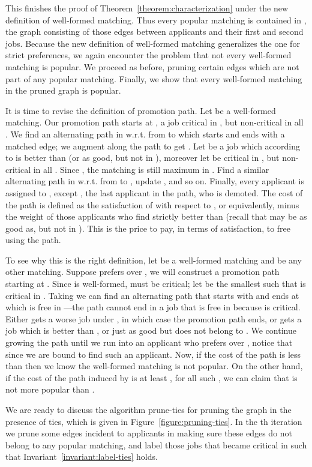 \documentclass[11pt]{article}
\newcommand{\wrt}{{w.r.t.}\xspace}
\begin{document}
{This finishes the proof of Theorem~\ref{theorem:characterization} under the new definition of well-formed matching. Thus every popular matching is contained in , the graph consisting of those edges between applicants and their first and second jobs. Because the new definition of well-formed matching generalizes the one for strict preferences, we again encounter the problem that not every well-formed matching is popular. We proceed as before, pruning certain edges which are not part of any popular matching. Finally, we show that every well-formed matching in the pruned graph is popular.

It is time to revise the definition of promotion path. Let  be a well-formed matching. Our promotion path starts at , a job critical in , but non-critical in all . We find an alternating path in  \wrt  from  to  which starts and ends with a matched edge; we augment along the path to get . Let  be a job which according to  is better than  (or as good, but not in ), moreover let  be critical in , but non-critical in all . Since , the matching  is still maximum in . Find a similar alternating path in  \wrt  from  to , update , and so on. Finally, every applicant  is assigned to , except , the last applicant in the path, who is demoted. The cost of the path is defined as the satisfaction of  with respect to , or equivalently,  minus the weight of those applicants  who find  strictly better than  (recall that  may be as good as, but not in ). This is the price to pay, in terms of satisfaction, to free  using the path.

To see why this is the right definition, let  be a well-formed matching and  be any other matching. Suppose  prefers  over , we will construct a promotion path starting at . Since  is well-formed,  must be critical; let  be the smallest  such that  is critical in . Taking  we can find an alternating path that starts with  and ends at  which is free in ---the path cannot end in a job that is free in  because  is critical. Either  gets a worse job under , in which case the promotion path ends, or gets a job  which is better than , or just as good but does not belong to . We continue growing the path until we run into an applicant  who prefers  over , notice that since  we  are bound to find such an applicant. Now, if the cost of the path is less than  then we know the well-formed matching  is not popular. On the other hand, if the cost of the path induced by  is at least , for all such , we can claim that  is not more popular than .

We are ready to discuss the algorithm {\sc prune-ties} for pruning the graph in the presence of ties, which is given in Figure~\ref{figure:pruning-ties}. In the th iteration we prune some edges incident to applicants in  making sure these edges do not belong to any popular matching, and label those jobs that became critical in  such that Invariant~\ref{invariant:label-ties} holds.

}
\end{document}
